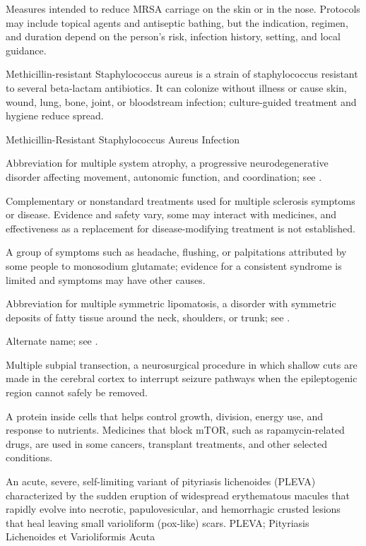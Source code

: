  Measures intended to reduce MRSA carriage on the skin or in the nose. Protocols may include topical
agents and antiseptic bathing, but the indication, regimen, and duration depend on the
person's risk, infection history, setting, and local guidance.

 Methicillin-resistant Staphylococcus aureus is a strain of staphylococcus resistant to several beta-lactam antibiotics. It can colonize without illness or cause skin, wound, lung, bone, joint, or bloodstream infection; culture-guided treatment and hygiene reduce spread.

\synonyms
Methicillin-Resistant Staphylococcus Aureus Infection

 Abbreviation for multiple system atrophy, a progressive neurodegenerative disorder affecting movement, autonomic function, and coordination; see .

 Complementary or nonstandard treatments used for multiple sclerosis symptoms or disease. Evidence and safety vary, some may interact with medicines, and effectiveness as a replacement for disease-modifying treatment is not established.

 A group of symptoms such as headache, flushing, or palpitations attributed by some people to monosodium glutamate; evidence for a consistent syndrome is limited and symptoms may have other causes.

 Abbreviation for multiple symmetric lipomatosis, a disorder with symmetric deposits of fatty tissue around the neck, shoulders, or trunk; see .

 Alternate name; see .

 Multiple subpial transection, a neurosurgical procedure in which shallow cuts are made in the cerebral cortex to interrupt seizure pathways when the epileptogenic region cannot safely be removed.

 A protein inside cells that helps control growth, division, energy use, and response to nutrients. Medicines that block mTOR, such as rapamycin-related drugs, are used in some cancers, transplant treatments, and other selected conditions.

 An acute, severe, self-limiting variant of pityriasis lichenoides (PLEVA) characterized by the sudden eruption of widespread erythematous macules that rapidly evolve into necrotic, papulovesicular, and hemorrhagic crusted lesions that heal leaving small varioliform (pox-like) scars.
\synonyms
PLEVA; Pityriasis Lichenoides et Varioliformis Acuta

